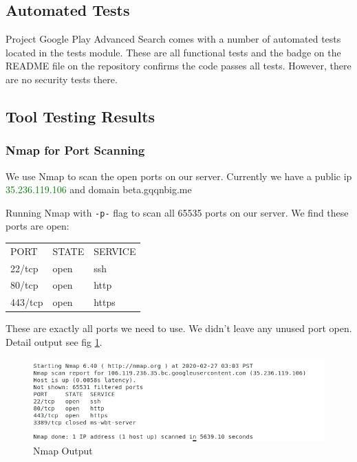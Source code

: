 \documentclass[12pt, a4paper]{article}
\newcommand{\code}[1]{\texttt{#1}}
\begin{document}
\subsection{Automated Tests}
Project Google Play Advanced Search comes with a number of automated tests located in the tests module. These are all functional tests and the badge on the README file on the repository confirms the code passes all tests. However, there are no security tests there.



\subsection{Tool Testing Results}
\subsubsection{Nmap for Port Scanning}
We use Nmap to scan the open ports on our server. Currently we have a public ip \textcolor{green}{35.236.119.106} and domain beta.gqqnbig.me

Running Nmap with \code{-p-} flag to scan all 65535 ports on our server.
We find these ports are open:
\begin{center}
    \begin{tabular}{l l l}
        PORT & STATE & SERVICE \\
        22/tcp & open & ssh\\
        80/tcp & open & http\\
        443/tcp & open & https
    \end{tabular}
\end{center}

These are exactly all ports we need to use. We didn't leave any unused port open. Detail output see fig \ref{fig:nmap}.

\begin{figure}[H]
\centering
\includegraphics[width=\textwidth, frame]{nmap_log.png}
\caption{Nmap Output}
\label{fig:nmap}
\end{figure}
\end{document}
